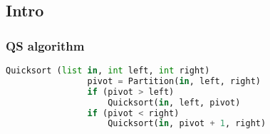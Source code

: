 \subsection{Intro}
    \subsubsection{QS algorithm}
    \begin{definition}
        \begin{lstlisting}[language=Python, caption={Quicksort Algorithm Pseudocode}]
            Quicksort (list in, int left, int right)
                pivot = Partition(in, left, right)
                if (pivot > left)
                    Quicksort(in, left, pivot)
                if (pivot < right)
                    Quicksort(in, pivot + 1, right)
        \end{lstlisting}
    \end{definition}

